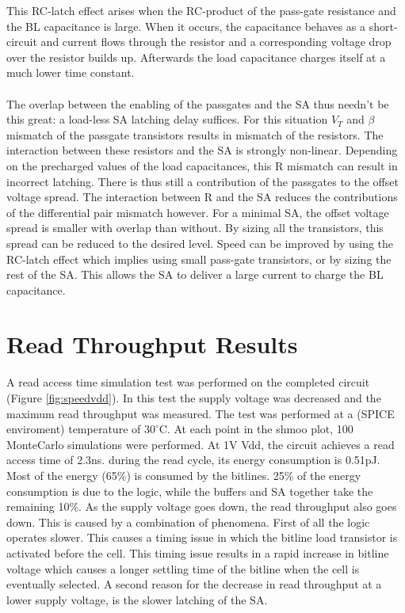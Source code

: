 \documentclass[journal]{IEEEtran}
\begin{document}
This RC-latch effect arises when the RC-product of the pass-gate resistance and the BL capacitance is large. When it occurs, the capacitance behaves as a short-circuit and current flows through the resistor and a corresponding voltage drop over the resistor builds up. Afterwards the load capacitance charges itself at a much lower time constant.\\\\
The overlap between the enabling of the passgates and the SA thus needn't be this great: a load-less SA latching delay suffices. For this situation $V_{T}$ and $\beta$ mismatch of the passgate transistors results in mismatch of the resistors. The interaction between these resistors and the SA is strongly non-linear. Depending on the precharged values of the load capacitances, this R mismatch can result in incorrect latching. There is thus still a contribution of the passgates to the offset voltage spread. The interaction between R and the SA reduces the contributions of the differential pair mismatch however. For a minimal SA, the offset voltage spread is smaller with overlap than without. By sizing all the transistors, this spread can be reduced to the desired level. Speed can be improved by using the RC-latch effect which implies using small pass-gate transistors, or by sizing the rest of the SA. This allows the SA to deliver a large current to charge the BL capacitance.

\section{Read Throughput Results}\label{final}
A read access time simulation test was performed on the completed circuit (Figure \ref{fig:speedvdd}). In this test the supply voltage was decreased and the maximum read throughput was measured. The test was performed at a (SPICE enviroment) temperature of $30^{\circ}\mathrm{C}$. At each point in the shmoo plot, 100 MonteCarlo simulations were performed. At 1V Vdd, the circuit achieves a read access time of 2.3ns. during the read cycle, its energy consumption is 0.51pJ. Most of the energy (65\%) is consumed by the bitlines. 25\% of the energy consumption is due to the logic, while the buffers and SA together take the remaining 10\%. As the supply voltage goes down, the read throughput also goes down. This is caused by a combination of phenomena. First of all the logic operates slower. This causes a timing issue in which the bitline load transistor is activated before the cell. This timing issue results in a rapid increase in bitline voltage which causes a longer settling time of the bitline when the cell is eventually selected. A second reason for the decrease in read throughput at a lower supply voltage, is the slower latching of the SA.
\end{document}
